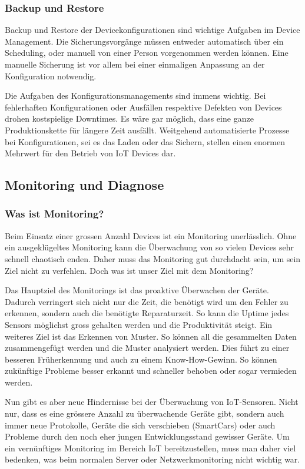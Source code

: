 \subsubsection{Backup und Restore} Backup und Restore der Devicekonfigurationen sind wichtige Aufgaben im Device Management. Die Sicherungsvorgänge müssen entweder automatisch über ein Scheduling, oder manuell von einer Person vorgenommen werden können. Eine manuelle Sicherung ist vor allem bei einer einmaligen Anpassung an der Konfiguration notwendig. 

Die Aufgaben des Konfigurationsmanagements sind immens wichtig. Bei fehlerhaften Konfigurationen oder Ausfällen respektive Defekten von Devices drohen kostspielige Downtimes. Es wäre gar möglich, dass eine ganze Produktionskette für längere Zeit ausfällt. Weitgehend automatisierte Prozesse bei Konfigurationen, sei es das Laden oder das Sichern, stellen einen enormen Mehrwert für den Betrieb von IoT Devices dar.

\subsection{Monitoring und Diagnose}
\subsubsection{Was ist Monitoring?}
Beim Einsatz einer grossen Anzahl Devices ist ein Monitoring unerlässlich. Ohne ein ausgeklügeltes Monitoring kann die Überwachung von so vielen Devices sehr schnell chaotisch enden. Daher muss das Monitoring gut durchdacht sein, um sein Ziel nicht zu verfehlen. Doch was ist unser Ziel mit dem Monitoring?

Das Hauptziel des Monitorings ist das proaktive Überwachen der Geräte. Dadurch verringert sich nicht nur die Zeit, die benötigt wird um den Fehler zu erkennen, sondern auch die benötigte Reparaturzeit. So kann die Uptime jedes Sensors möglichst gross gehalten werden und die Produktivität steigt. Ein weiteres Ziel ist das Erkennen von Muster. So können all die gesammelten Daten zusammengefügt werden und die Muster analysiert werden. Dies führt zu einer besseren Früherkennung und auch zu einem Know-How-Gewinn. So können zukünftige Probleme besser erkannt und schneller behoben oder sogar vermieden werden.\cite{MonZiele}

Nun gibt es aber neue Hindernisse bei der Überwachung von IoT-Sensoren. Nicht nur, dass es eine grössere Anzahl zu überwachende Geräte gibt, sondern auch immer neue Protokolle, Geräte die sich verschieben (SmartCars) oder auch Probleme durch den noch eher jungen Entwicklungsstand gewisser Geräte. Um ein vernünftiges Monitoring im Bereich IoT bereitzustellen, muss man daher viel bedenken, was beim normalen Server oder Netzwerkmonitoring nicht wichtig war.
